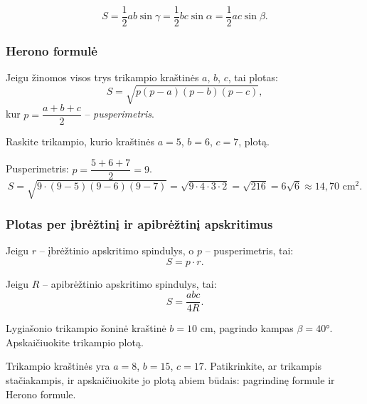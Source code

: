 \begin{tcolorbox}[colback=green!5!white, colframe=green!60!black, title=Visos trys kraštinių–kampo formulės]
\[
S = \frac{1}{2} a b \sin\gamma = \frac{1}{2} b c \sin\alpha = \frac{1}{2} a c \sin\beta.
\]
\end{tcolorbox}

\subsubsection*{Herono formulė}

\begin{theorem}
Jeigu žinomos visos trys trikampio kraštinės $a$, $b$, $c$, tai plotas:
\[
S = \sqrt{p(p-a)(p-b)(p-c)},
\]
kur $p = \dfrac{a+b+c}{2}$ – \emph{pusperimetris}.
\end{theorem}

\begin{example}
Raskite trikampio, kurio kraštinės $a = 5$, $b = 6$, $c = 7$, plotą.

Pusperimetris: $p = \dfrac{5+6+7}{2} = 9$.
\[
S = \sqrt{9 \cdot (9-5)(9-6)(9-7)} = \sqrt{9 \cdot 4 \cdot 3 \cdot 2} = \sqrt{216} = 6\sqrt{6} \approx 14{,}70 \text{ cm}^2.
\]
\end{example}

\subsubsection*{Plotas per įbrėžtinį ir apibrėžtinį apskritimus}

\begin{theorem}
Jeigu $r$ – įbrėžtinio apskritimo spindulys, o $p$ – pusperimetris, tai:
\[
S = p \cdot r.
\]
\end{theorem}

\begin{theorem}
Jeigu $R$ – apibrėžtinio apskritimo spindulys, tai:
\[
S = \frac{abc}{4R}.
\]
\end{theorem}

\begin{exercise}
Lygiašonio trikampio šoninė kraštinė $b = 10$ cm, pagrindo kampas $\beta = 40°$.
Apskaičiuokite trikampio plotą.
\end{exercise}

\begin{exercise}
Trikampio kraštinės yra $a = 8$, $b = 15$, $c = 17$. Patikrinkite, ar trikampis stačiakampis,
ir apskaičiuokite jo plotą abiem būdais: pagrindinę formule ir Herono formule.
\end{exercise}

